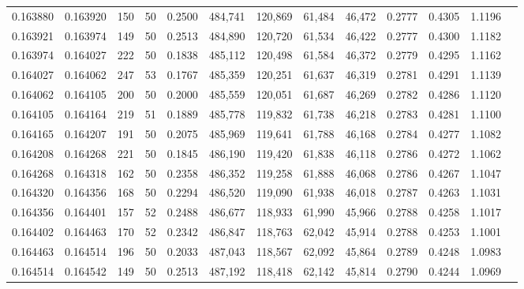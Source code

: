 \begin{tabular}{rrrrrrrrrrrrr}
0.163880 & 0.163920 &   150 &  50 &                                     0.2500 & 484,741 & 120,869 &  61,484 &  46,472 & 0.2777 & 0.4305 & 1.1196 \\
0.163921 & 0.163974 &   149 &  50 &                                     0.2513 & 484,890 & 120,720 &  61,534 &  46,422 & 0.2777 & 0.4300 & 1.1182 \\
0.163974 & 0.164027 &   222 &  50 &                                     0.1838 & 485,112 & 120,498 &  61,584 &  46,372 & 0.2779 & 0.4295 & 1.1162 \\
0.164027 & 0.164062 &   247 &  53 &                                     0.1767 & 485,359 & 120,251 &  61,637 &  46,319 & 0.2781 & 0.4291 & 1.1139 \\
0.164062 & 0.164105 &   200 &  50 &                                     0.2000 & 485,559 & 120,051 &  61,687 &  46,269 & 0.2782 & 0.4286 & 1.1120 \\
0.164105 & 0.164164 &   219 &  51 &                                     0.1889 & 485,778 & 119,832 &  61,738 &  46,218 & 0.2783 & 0.4281 & 1.1100 \\
0.164165 & 0.164207 &   191 &  50 &                                     0.2075 & 485,969 & 119,641 &  61,788 &  46,168 & 0.2784 & 0.4277 & 1.1082 \\
0.164208 & 0.164268 &   221 &  50 &                                     0.1845 & 486,190 & 119,420 &  61,838 &  46,118 & 0.2786 & 0.4272 & 1.1062 \\
0.164268 & 0.164318 &   162 &  50 &                                     0.2358 & 486,352 & 119,258 &  61,888 &  46,068 & 0.2786 & 0.4267 & 1.1047 \\
0.164320 & 0.164356 &   168 &  50 &                                     0.2294 & 486,520 & 119,090 &  61,938 &  46,018 & 0.2787 & 0.4263 & 1.1031 \\
0.164356 & 0.164401 &   157 &  52 &                                     0.2488 & 486,677 & 118,933 &  61,990 &  45,966 & 0.2788 & 0.4258 & 1.1017 \\
0.164402 & 0.164463 &   170 &  52 &                                     0.2342 & 486,847 & 118,763 &  62,042 &  45,914 & 0.2788 & 0.4253 & 1.1001 \\
0.164463 & 0.164514 &   196 &  50 &                                     0.2033 & 487,043 & 118,567 &  62,092 &  45,864 & 0.2789 & 0.4248 & 1.0983 \\
0.164514 & 0.164542 &   149 &  50 &                                     0.2513 & 487,192 & 118,418 &  62,142 &  45,814 & 0.2790 & 0.4244 & 1.0969 \\

\end{tabular}
